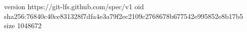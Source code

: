 version https://git-lfs.github.com/spec/v1
oid sha256:76840c40ce831328f7dfa4e3a79f2ec2109c2768678b677542e995852e8b17b5
size 1048672
